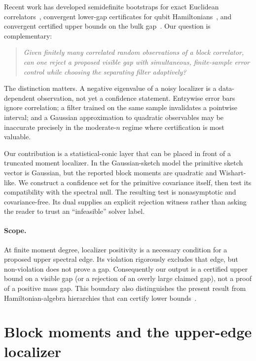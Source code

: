 \documentclass[11pt]{article}
\begin{document}
Recent work has developed semidefinite bootstraps for exact Euclidean
correlators~\cite{Cho2025}, convergent lower-gap certificates for qubit
Hamiltonians~\cite{Rao2025}, and convergent certified upper bounds on the bulk
gap~\cite{Xu2026}.  Our question is complementary:
\begin{quote}
\emph{Given finitely many correlated random observations of a block
correlator, can one reject a proposed visible gap with simultaneous,
finite-sample error control while choosing the separating filter adaptively?}
\end{quote}
The distinction matters.  A negative eigenvalue of a noisy localizer is a
data-dependent observation, not yet a confidence statement.  Entrywise error
bars ignore correlation; a filter trained on the same sample invalidates a
pointwise interval; and a Gaussian approximation to quadratic observables may
be inaccurate precisely in the moderate-$n$ regime where certification is most
valuable.

Our contribution is a statistical-conic layer that can be placed in front of a
truncated moment localizer.  In the Gaussian-sketch model the primitive sketch
vector is Gaussian, but the reported block moments are quadratic and
Wishart-like.  We construct a confidence set for the primitive covariance
itself, then test its compatibility with the spectral null.  The resulting test
is nonasymptotic and covariance-free.  Its dual supplies an explicit rejection
witness rather than asking the reader to trust an ``infeasible'' solver label.

\paragraph{Scope.}
At finite moment degree, localizer positivity is a necessary condition for a
proposed upper spectral edge.  Its violation rigorously excludes that edge, but
non-violation does not prove a gap.  Consequently our output is a certified
upper bound on a visible gap (or a rejection of an overly large claimed gap),
not a proof of a positive mass gap.  This boundary also distinguishes the
present result from Hamiltonian-algebra hierarchies that can certify lower
bounds~\cite{Rao2025}.

\section{Block moments and the upper-edge localizer}
\end{document}
